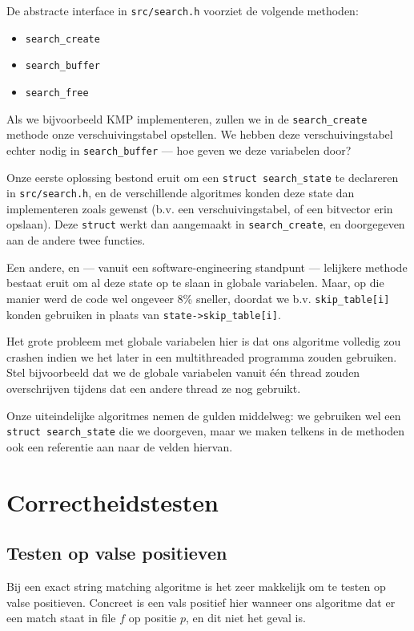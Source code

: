 \documentclass[a4paper,11pt]{article}
\begin{document}
De abstracte interface in \verb#src/search.h# voorziet de volgende methoden:

\begin{itemize}
    \item \verb#search_create#
    \item \verb#search_buffer#
    \item \verb#search_free#
\end{itemize}

Als we bijvoorbeeld KMP implementeren, zullen we in de \verb#search_create#
methode onze verschuivingstabel opstellen. We hebben deze verschuivingstabel
echter nodig in \verb#search_buffer# — hoe geven we deze variabelen door?

Onze eerste oplossing bestond eruit om een \verb#struct search_state# te
declareren in \verb#src/search.h#, en de verschillende algoritmes konden
deze state dan implementeren zoals gewenst (b.v. een verschuivingstabel,
of een bitvector erin opslaan). Deze \verb#struct# werkt dan aangemaakt in
\verb#search_create#, en doorgegeven aan de andere twee functies.

Een andere, en — vanuit een software-engineering standpunt — lelijkere methode
bestaat eruit om al deze state op te slaan in globale variabelen. Maar, op die
manier werd de code wel ongeveer 8\% sneller, doordat we b.v.
\verb#skip_table[i]# konden gebruiken in plaats van \verb#state->skip_table[i]#.

Het grote probleem met globale variabelen hier is dat ons algoritme volledig zou
crashen indien we het later in een multithreaded programma zouden gebruiken.
Stel bijvoorbeeld dat we de globale variabelen vanuit \'e\'en thread zouden
overschrijven tijdens dat een andere thread ze nog gebruikt.

Onze uiteindelijke algoritmes nemen de gulden middelweg: we gebruiken wel een
\verb#struct search_state# die we doorgeven, maar we maken telkens in de
methoden ook een referentie aan naar de velden hiervan.

\section{Correctheidstesten}

\subsection{Testen op valse positieven}

Bij een exact string matching algoritme is het zeer makkelijk om te testen op
valse positieven. Concreet is een vals positief hier wanneer ons algoritme dat
er een match staat in file $f$ op positie $p$, en dit niet het geval is.
\end{document}
